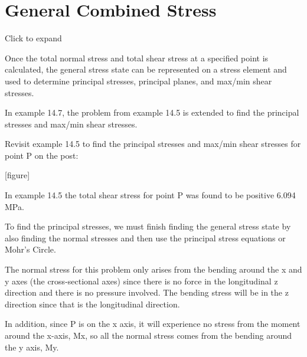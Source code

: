 \documentclass[
  letterpaper,
  DIV=11,
  numbers=noendperiod]{scrreprt}
\begin{document}
\section{General Combined Stress}\label{general-combined-stress}

Click to expand

Once the total normal stress and total shear stress at a specified point
is calculated, the general stress state can be represented on a stress
element and used to determine principal stresses, principal planes, and
max/min shear stresses.

In example 14.7, the problem from example 14.5 is extended to find the
principal stresses and max/min shear stresses.

\begin{tcolorbox}[enhanced jigsaw, breakable, opacityback=0, toptitle=1mm, left=2mm, colback=white, opacitybacktitle=0.6, colframe=quarto-callout-note-color-frame, titlerule=0mm, arc=.35mm, leftrule=.75mm, bottomtitle=1mm, colbacktitle=quarto-callout-note-color!10!white, rightrule=.15mm, title={Example 14.7:}, bottomrule=.15mm, toprule=.15mm, coltitle=black]

Revisit example 14.5 to find the principal stresses and max/min shear
stresses for point P on the post:

{[}figure{]}

\begin{tcolorbox}[enhanced jigsaw, breakable, opacityback=0, toptitle=1mm, left=2mm, colback=white, opacitybacktitle=0.6, colframe=quarto-callout-note-color-frame, titlerule=0mm, arc=.35mm, leftrule=.75mm, bottomtitle=1mm, colbacktitle=quarto-callout-note-color!10!white, rightrule=.15mm, title={Solution}, bottomrule=.15mm, toprule=.15mm, coltitle=black]

In example 14.5 the total shear stress for point P was found to be
positive 6.094 MPa.

To find the principal stresses, we must finish finding the general
stress state by also finding the normal stresses and then use the
principal stress equations or Mohr's Circle.

The normal stress for this problem only arises from the bending around
the x and y axes (the cross-sectional axes) since there is no force in
the longitudinal z direction and there is no pressure involved. The
bending stress will be in the z direction since that is the longitudinal
direction.

In addition, since P is on the x axis, it will experience no stress from
the moment around the x-axis, Mx, so all the normal stress comes from
the bending around the y axis, My.


\end{tcolorbox}
\end{tcolorbox}
\end{document}
